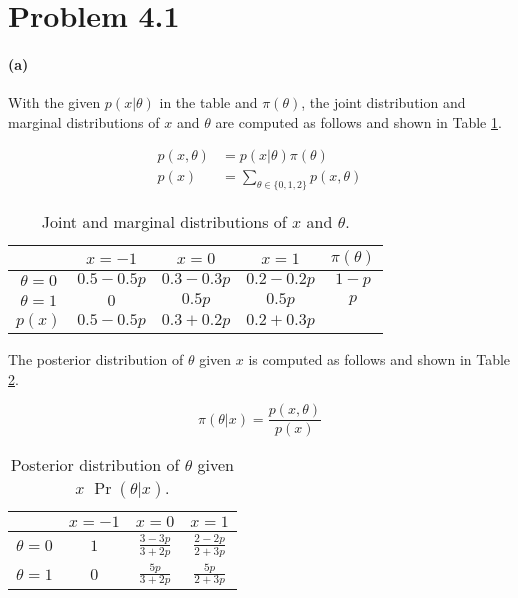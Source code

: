 \section{Problem 4.1}
\paragraph{(a)}
With the given $p(x \vert \theta)$ in the table and $\pi(\theta)$, the joint distribution and marginal distributions of $x$ and $\theta$ are computed as follows and shown in Table \ref{tab:4-1-joint}.

\begin{align*}
    p(x, \theta) &= p(x \vert \theta) \pi(\theta) \\
    p(x) &= \sum_{\theta \in \{0, 1, 2\}} p(x, \theta)
\end{align*}

\begin{table}[ht]
    \centering
    \begin{tabular}{c c c c c}
    \toprule
    & $x=-1$ & $x=0$ & $x=1$ & $\pi(\theta)$ \\
    \midrule
    $\theta = 0$    & $0.5-0.5p$  & $0.3-0.3p$  & $0.2-0.2p$  &  $1-p$ \\
    $\theta = 1$    & $0$  & $0.5p$   & $0.5p$  & $p$ \\
    $p(x)$          & $0.5-0.5p$   & $0.3+0.2p$  & $0.2+0.3p$  &  \\
    \bottomrule
    \end{tabular}
    \caption{Joint and marginal distributions of $x$ and $\theta$.}
    \label{tab:4-1-joint}
\end{table}

The posterior distribution of $\theta$ given $x$ is computed as follows and shown in Table \ref{tab:4-1-post}.

\begin{equation*}
    \pi(\theta \vert x) = \frac{p(x, \theta)}{p(x)}
\end{equation*}

\begin{table}[ht]
    \centering
    \begin{tabular}{c c c c}
    \toprule
    & $x=-1$ & $x=0$ & $x=1$ \\
    \midrule
    $\theta = 0$    & $1$  & $\frac{3-3p}{3+2p}$  & $\frac{2-2p}{2+3p}$  \\
    $\theta = 1$    & $0$  & $\frac{5p}{3+2p}$  & $\frac{5p}{2+3p}$  \\
    \bottomrule
    \end{tabular}
    \caption{Posterior distribution of $\theta$ given $x$ $\Pr(\theta \vert x)$.}
    \label{tab:4-1-post}
\end{table}

